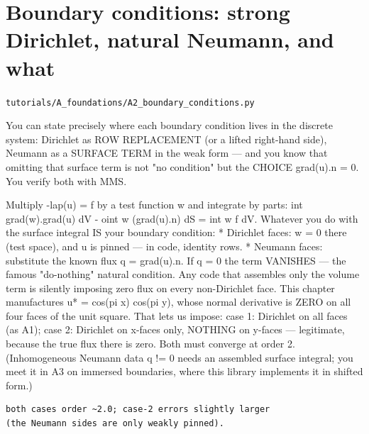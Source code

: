 \chapter{Boundary conditions: strong Dirichlet, natural Neumann, and what}
\label{ch:A2_boundary_conditions}
\noindent\texttt{tutorials/A\_foundations/A2\_boundary\_conditions.py}\\[0.75em]
\begin{outcome}
You can state precisely where each boundary condition
lives in the discrete system: Dirichlet as ROW REPLACEMENT (or a lifted
right-hand side), Neumann as a SURFACE TERM in the weak form — and you know
that omitting that surface term is not "no condition" but the CHOICE
grad(u).n = 0. You verify both with MMS.
\end{outcome}

Multiply -lap(u) = f by a test function w and integrate by
parts:
    int grad(w).grad(u) dV  -  oint w (grad(u).n) dS  =  int w f dV.
Whatever you do with the surface integral IS your boundary condition:
  * Dirichlet faces: w = 0 there (test space), and u is pinned — in code,
    identity rows.
  * Neumann faces: substitute the known flux q = grad(u).n. If q = 0 the
    term VANISHES — the famous "do-nothing" natural condition. Any code
    that assembles only the volume term is silently imposing zero flux on
    every non-Dirichlet face.
This chapter manufactures u* = cos(pi x) cos(pi y), whose normal derivative
is ZERO on all four faces of the unit square. That lets us impose:
  case 1: Dirichlet on all faces (as A1);
  case 2: Dirichlet on x-faces only, NOTHING on y-faces — legitimate,
          because the true flux there is zero.
Both must converge at order 2. (Inhomogeneous Neumann data q != 0 needs an
assembled surface integral; you meet it in A3 on immersed boundaries, where
this library implements it in shifted form.)

\begin{expected}
\begin{verbatim}
both cases order ~2.0; case-2 errors slightly larger
(the Neumann sides are only weakly pinned).
\end{verbatim}
\end{expected}

